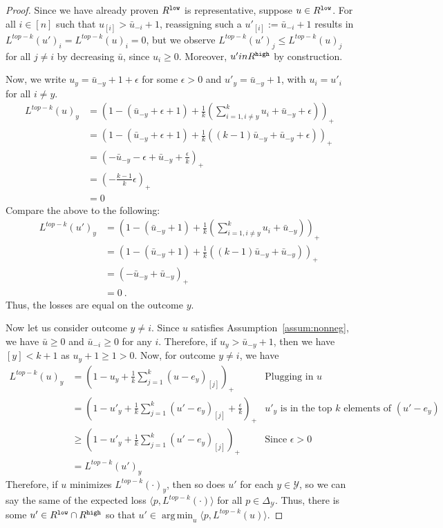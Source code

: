 \documentclass[12pt]{article}
\newcommand{\ubar}{\bar{u}}
\newcommand{\simplex}{\Delta_\Y}
\newcommand{\Y}{\mathcal{Y}}
\newcommand{\inprod}[2]{\langle #1, #2 \rangle}%
\DeclareMathOperator*{\argmin}{arg\,min}
\begin{document}
\begin{proof}
  Since we have already proven $R^{\tt low}$ is representative, suppose $u \in R^{\tt low}$.
  For all $i \in [n]$ such that $u_{[i]} > \bar u_{-i} + 1$, reassigning such a $u'_{[i]} := \bar u_{-i} +1$ results in $L^{top-k}(u')_i = L^{top-k}(u)_i = 0$, but we observe $L^{top-k}(u')_j \leq L^{top-k}(u)_j$ for all $j \neq i$ by decreasing $\ubar$, since $u_i \geq 0$.
  Moreover, $u' in R^{\tt high}$ by construction.

Now, we write $u_y = \bar u_{-y} + 1 + \epsilon$ for some $\epsilon > 0$ and $u'_y = \bar u_{-y} + 1$, with $u_i = u'_i$ for all $i \neq y$. 
\begin{align*}
L^{top-k}(u)_y &= \left(1 - (\bar u_{-y} + \epsilon + 1) + \frac 1 k \left(\sum_{i=1, i \neq y}^k u_i + \bar u_{-y} + \epsilon\right) \right)_+\\ 
&= \left(1 - (\bar u_{-y} + \epsilon + 1) + \frac 1 k \left((k-1) \bar u_{-y} + \bar u_{-y} + \epsilon\right) \right)_+\\
&= \left(-\bar u_{-y} - \epsilon + \bar u_{-y} + \frac \epsilon k \right)_+ \\
&= (-\frac{k-1}{k}\epsilon)_+\\
&= 0
\end{align*}
Compare the above to the following:
\begin{align*}
L^{top-k}(u')_y &= \left(1 - (\bar u_{-y} + 1) + \frac 1 k \left(\sum_{i=1, i \neq y}^k u_i + \bar u_{-y} \right) \right)_+\\ 
&= \left(1 - (\bar u_{-y} + 1) + \frac 1 k \left((k-1) \bar u_{-y} + \bar u_{-y} \right) \right)_+\\
&= \left(-\bar u_{-y} + \bar u_{-y}\right)_+ \\
&= 0~.~
\end{align*}
Thus, the losses are equal on the outcome $y$.

Now let us consider outcome $y\neq i$.
Since $u$ satisfies Assumption~\ref{assum:nonneg}, we have $\bar u \geq 0$ and $\bar u_{-i} \geq 0$ for any $i$.
Therefore, if $u_y > \bar u_{-y} + 1$, then we have $[y] < k+1$ as $u_y + 1 \geq 1 > 0$.
Now, for outcome $y \neq i$, we have 
\begin{align*}
L^{top-k}(u)_y &= \left( 1 - u_y + \frac 1 k \sum_{j=1}^k (u-e_y)_{[j]} \right)_+ &\text{Plugging in $u$}\\
	&= \left( 1 - u'_y + \frac 1 k \sum_{j=1}^k (u'-e_y)_{[j]} + \frac {\epsilon}{k}\right)_+ & \text{$u'_y$ is in the top $k$ elements of $(u' - e_y)$}\\
	&\geq \left( 1 - u'_y + \frac 1 k \sum_{j=1}^k (u'-e_y)_{[j]}\right)_+ & \text{Since $\epsilon > 0$}\\
	&= L^{top-k}(u')_y
\end{align*}
Therefore, if $u$ minimizes $L^{top-k}(\cdot)_y$, then so does $u'$ for each $y \in \Y$, so we can say the same of the expected loss $\inprod{p}{L^{top-k}(\cdot)}$ for all $p \in \simplex$.
Thus, there is some $u' \in R^{\tt low} \cap R^{\tt high}$ so that $u' \in \argmin_u \inprod{p}{L^{top-k}(u)}$.
\end{proof}
\end{document}
